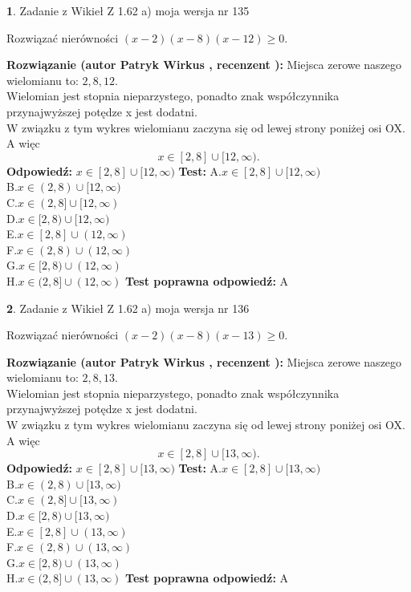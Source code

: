 \documentclass[12pt, a4paper]{article}
\theoremstyle{definition} %
\newtheorem{zad}{}
\newcommand{\zadStart}[1]{\begin{zad}#1\newline}
\newcommand{\zadStop}{\end{zad}}
\newcommand{\rozwStart}[2]{\noindent \textbf{Rozwiązanie (autor #1 , recenzent #2): }\newline}
\newcommand{\rozwStop}{\newline}
\newcommand{\odpStart}{\noindent \textbf{Odpowiedź:}\newline}
\newcommand{\odpStop}{\newline}
\newcommand{\testStart}{\noindent \textbf{Test:}\newline}
\newcommand{\testStop}{\newline}
\newcommand{\kluczStart}{\noindent \textbf{Test poprawna odpowiedź:}\newline}
\newcommand{\kluczStop}{\newline}
\begin{document}
\zadStart{Zadanie z Wikieł Z 1.62 a) moja wersja nr 135}

Rozwiązać nierówności $(x-2)(x-8)(x-12)\ge0$.
\zadStop
\rozwStart{Patryk Wirkus}{}
Miejsca zerowe naszego wielomianu to: $2, 8, 12$.\\
Wielomian jest stopnia nieparzystego, ponadto znak współczynnika przy\linebreak najwyższej potędze x jest dodatni.\\ W związku z tym wykres wielomianu zaczyna się od lewej strony poniżej osi OX. A więc $$x \in [2,8] \cup [12,\infty).$$
\rozwStop
\odpStart
$x \in [2,8] \cup [12,\infty)$
\odpStop
\testStart
A.$x \in [2,8] \cup [12,\infty)$\\
B.$x \in (2,8) \cup [12,\infty)$\\
C.$x \in (2,8] \cup [12,\infty)$\\
D.$x \in [2,8) \cup [12,\infty)$\\
E.$x \in [2,8] \cup (12,\infty)$\\
F.$x \in (2,8) \cup (12,\infty)$\\
G.$x \in [2,8) \cup (12,\infty)$\\
H.$x \in (2,8] \cup (12,\infty)$
\testStop
\kluczStart
A
\kluczStop



\zadStart{Zadanie z Wikieł Z 1.62 a) moja wersja nr 136}

Rozwiązać nierówności $(x-2)(x-8)(x-13)\ge0$.
\zadStop
\rozwStart{Patryk Wirkus}{}
Miejsca zerowe naszego wielomianu to: $2, 8, 13$.\\
Wielomian jest stopnia nieparzystego, ponadto znak współczynnika przy\linebreak najwyższej potędze x jest dodatni.\\ W związku z tym wykres wielomianu zaczyna się od lewej strony poniżej osi OX. A więc $$x \in [2,8] \cup [13,\infty).$$
\rozwStop
\odpStart
$x \in [2,8] \cup [13,\infty)$
\odpStop
\testStart
A.$x \in [2,8] \cup [13,\infty)$\\
B.$x \in (2,8) \cup [13,\infty)$\\
C.$x \in (2,8] \cup [13,\infty)$\\
D.$x \in [2,8) \cup [13,\infty)$\\
E.$x \in [2,8] \cup (13,\infty)$\\
F.$x \in (2,8) \cup (13,\infty)$\\
G.$x \in [2,8) \cup (13,\infty)$\\
H.$x \in (2,8] \cup (13,\infty)$
\testStop
\kluczStart
A
\kluczStop
\end{document}

